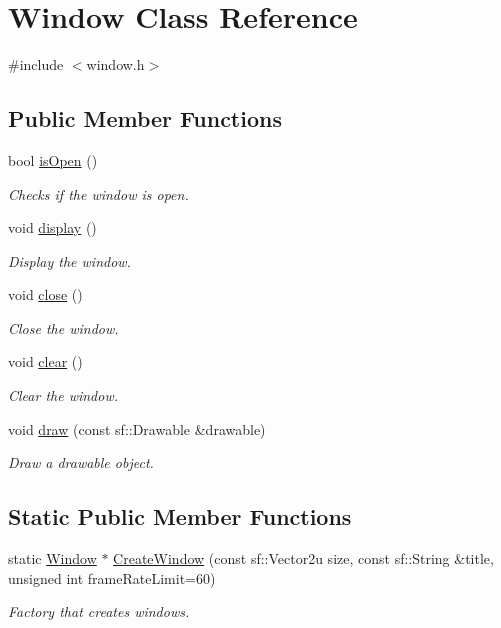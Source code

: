 \hypertarget{class_window}{}\section{Window Class Reference}
\label{class_window}


{\ttfamily \#include $<$window.\+h$>$}

\subsection*{Public Member Functions}
\begin{DoxyCompactItemize}
\item 
bool \hyperlink{class_window_a0530ead23b2c91ef90a5f98e4df41cb8}{is\+Open} ()
\begin{DoxyCompactList}\small\item\em Checks if the window is open. \end{DoxyCompactList}\item 
void \hyperlink{class_window_afadfafa5a0b9472554759004aafb327e}{display} ()
\begin{DoxyCompactList}\small\item\em Display the window. \end{DoxyCompactList}\item 
void \hyperlink{class_window_a35055c04498121d39741bfcd5082705b}{close} ()
\begin{DoxyCompactList}\small\item\em Close the window. \end{DoxyCompactList}\item 
void \hyperlink{class_window_a38bc43bdd1a97e5de7f346ba4c3957ef}{clear} ()
\begin{DoxyCompactList}\small\item\em Clear the window. \end{DoxyCompactList}\item 
void \hyperlink{class_window_adfb2d5826942693e289d13f314a341f7}{draw} (const sf\+::\+Drawable \&drawable)
\begin{DoxyCompactList}\small\item\em Draw a drawable object. \end{DoxyCompactList}\end{DoxyCompactItemize}
\subsection*{Static Public Member Functions}
\begin{DoxyCompactItemize}
\item 
static \hyperlink{class_window}{Window} $\ast$ \hyperlink{class_window_ac23ace79f02693ff5463f91dba8bb38b}{Create\+Window} (const sf\+::\+Vector2u size, const sf\+::\+String \&title, unsigned int frame\+Rate\+Limit=60)
\begin{DoxyCompactList}\small\item\em Factory that creates windows. \end{DoxyCompactList}\end{DoxyCompactItemize}
